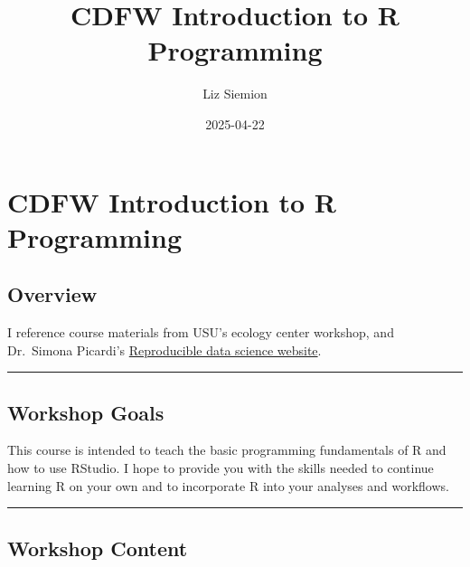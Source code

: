 \documentclass[
]{book}
\title{CDFW Introduction to R Programming}
\author{Liz Siemion}
\date{2025-04-22}
\begin{document}
\maketitle

{
\setcounter{tocdepth}{1}
\tableofcontents
}
\chapter{CDFW Introduction to R Programming}\label{overview}

\section{Overview}\label{overview-1}

I reference course materials from USU's ecology center workshop, and Dr.~Simona Picardi's \href{https://ecorepsci.github.io/reproducible-science/index.html}{Reproducible data science website}.

\begin{center}\rule{0.5\linewidth}{0.5pt}\end{center}

\section{Workshop Goals}\label{workshop-goals}

This course is intended to teach the basic programming fundamentals of R and
how to use RStudio. I hope to provide you with the skills needed to continue
learning R on your own and to incorporate R into your analyses and workflows.

\begin{center}\rule{0.5\linewidth}{0.5pt}\end{center}

\section{Workshop Content}\label{workshop-content}
\end{document}
